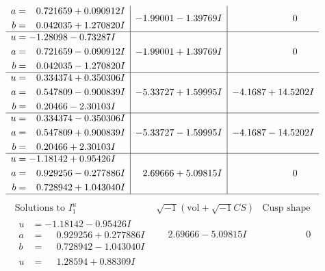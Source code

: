 \documentclass[1p]{elsarticle_modified}
\theoremstyle{definition}
\newcommand{\I}{\sqrt{-1}}
\begin{document}
$$\begin{array}{c|c|c}
\begin{aligned}
a &= \phantom{-}0.721659 + 0.090912 I \\
b &= \phantom{-}0.042035 + 1.270820 I\end{aligned}
 & -1.99001 - 1.39769 I & \phantom{-0.000000 } 0 \\ \hline\begin{aligned}
u &= -1.28098 - 0.73287 I \\
a &= \phantom{-}0.721659 - 0.090912 I \\
b &= \phantom{-}0.042035 - 1.270820 I\end{aligned}
 & -1.99001 + 1.39769 I & \phantom{-0.000000 } 0 \\ \hline\begin{aligned}
u &= \phantom{-}0.334374 + 0.350306 I \\
a &= \phantom{-}0.547809 - 0.900839 I \\
b &= \phantom{-}0.20466 - 2.30103 I\end{aligned}
 & -5.33727 + 1.59995 I & -4.1687 + 14.5202 I \\ \hline\begin{aligned}
u &= \phantom{-}0.334374 - 0.350306 I \\
a &= \phantom{-}0.547809 + 0.900839 I \\
b &= \phantom{-}0.20466 + 2.30103 I\end{aligned}
 & -5.33727 - 1.59995 I & -4.1687 - 14.5202 I \\ \hline\begin{aligned}
u &= -1.18142 + 0.95426 I \\
a &= \phantom{-}0.929256 - 0.277886 I \\
b &= \phantom{-}0.728942 + 1.043040 I\end{aligned}
 & \phantom{-}2.69666 + 5.09815 I & \phantom{-0.000000 } 0\\
 \hline 
 \end{array}$$\newpage$$\begin{array}{c|c|c}  
\text{Solutions to }I^u_{1}& \I (\text{vol} + \sqrt{-1}CS) & \text{Cusp shape}\\
 \hline 
\begin{aligned}
u &= -1.18142 - 0.95426 I \\
a &= \phantom{-}0.929256 + 0.277886 I \\
b &= \phantom{-}0.728942 - 1.043040 I\end{aligned}
 & \phantom{-}2.69666 - 5.09815 I & \phantom{-0.000000 } 0 \\ \hline\begin{aligned}
u &= \phantom{-}1.28594 + 0.88309 I \\

\end{aligned}
\end{array}$$
\end{document}
